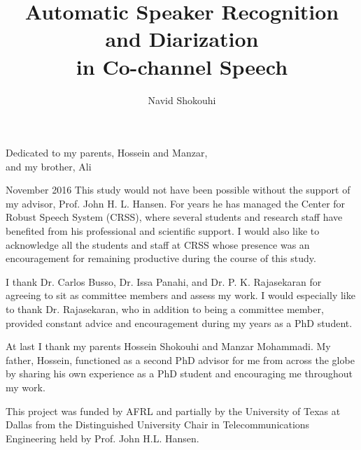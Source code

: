 \documentclass[doublespacing]{utdthesis}
\author{Navid Shokouhi}
\title{Automatic Speaker Recognition and Diarization \\
		in Co-channel Speech}
\begin{document}
\frontmatter

\signaturepage

\begin{dedication} %
Dedicated to my parents, Hossein and Manzar, \\ 
and my brother, Ali \\
\end{dedication}

\maketitle

\begin{acks}{November 2016} %
This study would not have been possible without the support of my advisor, Prof. John H. L. Hansen. 
For years he has managed the Center for Robust Speech System (CRSS), where several students and research staff have benefited from his professional and scientific support. 
I would also like to acknowledge all the students and staff at CRSS whose presence was an encouragement for remaining productive during the course of this study. 

I thank Dr. Carlos Busso, Dr. Issa Panahi, and Dr. P. K. Rajasekaran for agreeing to sit as committee members and assess my work. 
I would especially like to thank Dr. Rajasekaran, who in addition to being a committee member, provided constant advice and encouragement during my years as a PhD student. 

At last I thank my parents Hossein Shokouhi and Manzar Mohammadi. 
My father, Hossein, functioned as a second PhD advisor for me from across the globe by sharing his own experience as a PhD student and encouraging me throughout my work. 

This project was funded by AFRL and partially by the University of Texas at Dallas from the Distinguished University Chair in Telecommunications Engineering held by Prof. John H.L. Hansen.

\end{acks}

\end{document}
